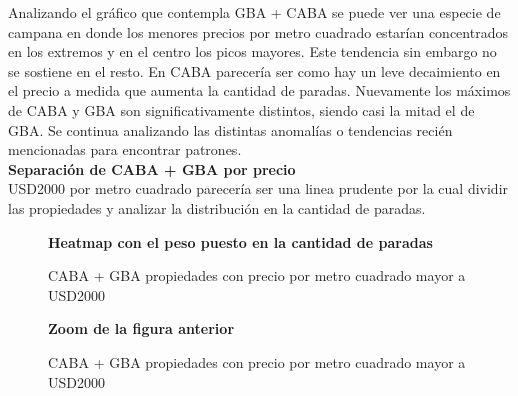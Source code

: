 \documentclass[a4paper, 10pt]{article}
\newcommand\tab[1][0.5cm]{\hspace*{#1}}
\begin{document}
				Analizando el gráfico que contempla GBA + CABA se puede ver una especie de campana en donde 
				los menores precios por metro cuadrado estarían concentrados en los extremos y en el centro 
				los picos mayores. Este tendencia sin embargo no se sostiene en el resto. En CABA parecería 
				ser como hay un leve decaimiento en el precio a medida que aumenta la cantidad de paradas. 
				Nuevamente los máximos de CABA y GBA son significativamente distintos, siendo casi la mitad 
				el de GBA. Se continua analizando las distintas anomalías o tendencias recién mencionadas 
				para encontrar patrones.\\
				
				\textbf{Separación de CABA + GBA por precio}\\
				\tab\textdollar USD2000 por metro cuadrado parecería ser una linea prudente por la cual 
				dividir las propiedades y analizar la distribución en la cantidad de paradas. 

				\begin{figure}
    				\centering
    				\textbf{Heatmap con el peso puesto en la cantidad de paradas}\par\medskip
    				\caption{CABA + GBA propiedades con precio por metro cuadrado mayor a \textdollar USD2000}
				\end{figure}
				\begin{figure}
    				\centering
    				\textbf{Zoom de la figura anterior}\par\medskip
    				\caption{CABA + GBA propiedades con precio por metro cuadrado mayor a \textdollar USD2000}
				\end{figure}								
				\FloatBarrier
				
\end{document}

